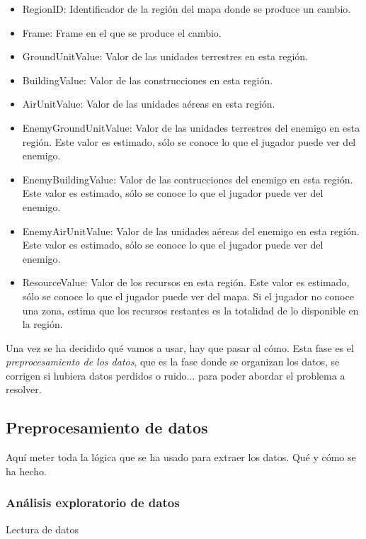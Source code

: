\documentclass[a4paper,11pt]{book}\usepackage[]{graphicx}\usepackage[]{color}
\begin{document}
\begin{itemize}
\begin{itemize}
    \item RegionID: Identificador de la región del mapa donde se produce un cambio.
    \item Frame: Frame en el que se produce el cambio.
    \item GroundUnitValue: Valor de las unidades terrestres en esta región.
    \item BuildingValue: Valor de las construcciones en esta región.
    \item AirUnitValue: Valor de las unidades aéreas en esta región.
    \item EnemyGroundUnitValue: Valor de las unidades terrestres del enemigo en esta región.
    Este valor es estimado, sólo se conoce lo que el jugador puede ver del enemigo.
    \item EnemyBuildingValue: Valor de las contrucciones del enemigo en esta región.
    Este valor es estimado, sólo se conoce lo que el jugador puede ver del enemigo.
    \item EnemyAirUnitValue: Valor de las unidades aéreas del enemigo en esta región.
    Este valor es estimado, sólo se conoce lo que el jugador puede ver del enemigo.
    \item ResourceValue: Valor de los recursos en esta región. Este valor es estimado,
    sólo se conoce lo que el jugador puede ver del mapa. Si el jugador no conoce una zona, estima que los recursos restantes es la totalidad de lo disponible en la región.
  \end{itemize}
\end{itemize}

Una vez se ha decidido qué vamos a usar, hay que pasar al cómo. Esta fase es el \emph{preprocesamiento de los datos}, que es la fase donde se organizan los datos, se corrigen si hubiera datos perdidos o ruido... para poder abordar el problema a resolver.

\subsection{Preprocesamiento de datos}

Aquí meter toda la lógica que se ha usado para extraer los datos. Qué y cómo se ha hecho.

\subsubsection{Análisis exploratorio de datos}

Lectura de datos
\end{document}

